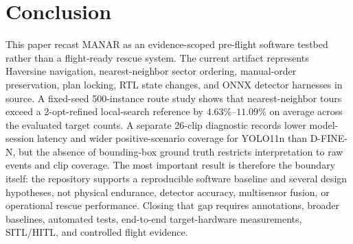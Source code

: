 \section{Conclusion}

This paper recast MANAR as an evidence-scoped pre-flight software testbed rather than a flight-ready rescue system. The current artifact represents Haversine navigation, nearest-neighbor sector ordering, manual-order preservation, plan locking, RTL state changes, and ONNX detector harnesses in source. A fixed-seed 500-instance route study shows that nearest-neighbor tours exceed a 2-opt-refined local-search reference by $4.63\%$--$11.09\%$ on average across the evaluated target counts. A separate 26-clip diagnostic records lower model-session latency and wider positive-scenario coverage for YOLO11n than D-FINE-N, but the absence of bounding-box ground truth restricts interpretation to raw events and clip coverage. The most important result is therefore the boundary itself: the repository supports a reproducible software baseline and several design hypotheses, not physical endurance, detector accuracy, multisensor fusion, or operational rescue performance. Closing that gap requires annotations, broader baselines, automated tests, end-to-end target-hardware measurements, SITL/HITL, and controlled flight evidence.

